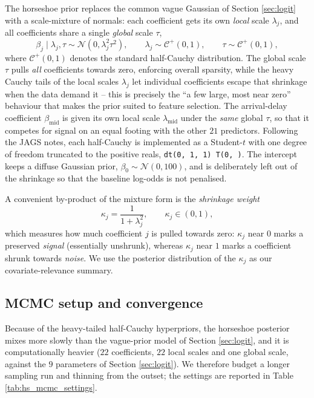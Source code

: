 The horseshoe prior replaces the common vague Gaussian of Section
\ref{sec:logit} with a scale-mixture of normals: each coefficient gets its own
\emph{local} scale $\lambda_j$, and all coefficients share a single
\emph{global} scale $\tau$,
\begin{equation}
    \beta_j \mid \lambda_j, \tau \sim \mathcal{N}(0, \lambda_j^2 \tau^2),
    \qquad
    \lambda_j \sim \mathcal{C}^+(0,1),
    \qquad
    \tau \sim \mathcal{C}^+(0,1),
    \label{eq:hs_prior}
\end{equation}
where $\mathcal{C}^+(0,1)$ denotes the standard half-Cauchy distribution. The
global scale $\tau$ pulls \emph{all} coefficients towards zero, enforcing overall
sparsity, while the heavy Cauchy tails of the local scales $\lambda_j$ let
individual coefficients escape that shrinkage when the data demand it -- this is
precisely the ``a few large, most near zero'' behaviour that makes the prior
suited to feature selection. The arrival-delay coefficient
$\beta_{\text{mid}}$ is given its own local scale $\lambda_{\text{mid}}$ under
the \emph{same} global $\tau$, so that it competes for signal on an equal footing
with the other $21$ predictors. Following the JAGS notes, each half-Cauchy is
implemented as a Student-$t$ with one degree of freedom truncated to the positive
reals, \texttt{dt(0, 1, 1)\,T(0, )}. The intercept keeps a diffuse Gaussian
prior, $\beta_0 \sim \mathcal{N}(0, 100)$, and is
deliberately left out of the shrinkage so that the baseline log-odds is not
penalised.

A convenient by-product of the mixture form is the \emph{shrinkage weight}
\begin{equation}
    \kappa_j = \frac{1}{1 + \lambda_j^2},
    \qquad \kappa_j \in (0,1),
    \label{eq:kappa}
\end{equation}
which measures how much coefficient $j$ is pulled towards zero: $\kappa_j$ near
$0$ marks a preserved \emph{signal} (essentially unshrunk), whereas $\kappa_j$
near $1$ marks a coefficient shrunk towards \emph{noise}. We use the posterior
distribution of the $\kappa_j$ as our covariate-relevance summary.

\subsection{MCMC setup and convergence}
Because of the heavy-tailed half-Cauchy hyperpriors, the horseshoe posterior
mixes more slowly than the vague-prior model of Section \ref{sec:logit}, and it
is computationally heavier ($22$ coefficients, $22$ local scales and one global
scale, against the $9$ parameters of Section \ref{sec:logit}). We therefore
budget a longer sampling run and thinning from the outset; the settings are
reported in Table \ref{tab:hs_mcmc_settings}.

